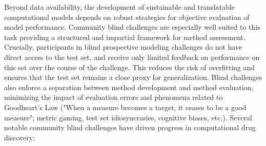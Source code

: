 \documentclass[journal=jcim,manuscript=article]{achemso}
\begin{document}
Beyond data availability, the development of sustainable and translatable computational models depends on robust strategies for objective evaluation of model performance\cite{wognum_call_2024, ash_practically_2024, kramer_need_2025}. Community blind challenges are especially well suited to this task providing a structured and impartial framework for method assessment. Crucially, participants in blind prospective modeling challenges do not have direct access to the test set, and receive only limited feedback on performance on this set over the course of the challenge. This reduces the risk of overfitting and ensures that the test set remains a close proxy for generalization. Blind challenges also enforce a separation between method development and method evaluation, minimizing the impact of evaluation errors and phenomena related to Goodheart's Law ("When a measure becomes a target, it ceases to be a good measure"; metric gaming, test set idiosyncrasies, cognitive biases, etc.)\cite{goodheart_types}. Several notable community blind challenges have driven progress in computational drug discovery: 
\end{document}
